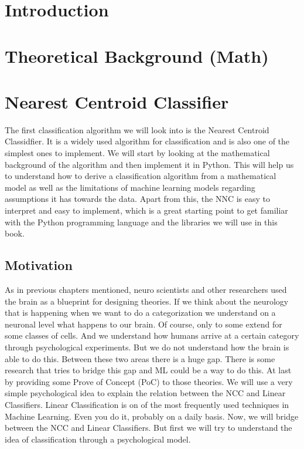 \documentclass[a4paper]{article}
\begin{document}
\pagestyle{fancy}
\begin{multicols}{2}
\tableofcontents
\end{multicols}
\newpage

\section{Introduction}

\section{Theoretical Background (Math)}

\section{Nearest Centroid Classifier}
The first classification algorithm we will look into is the Nearest Centroid Classidfier.
It is a widely used algorithm for classification and is also one of the simplest ones to implement.
We will start by looking at the mathematical background of the algorithm and then implement it in Python.
This will help us to understand how to derive a classification algorithm from a mathematical model as well as the
limitations of machine learning models regarding assumptions it has towards the data.
Apart from this, the NNC is easy to interpret and easy to implement, which is a great starting point to get familiar with 
the Python programming language and the libraries we will use in this book.

\subsection{Motivation}
As in previous chapters mentioned, neuro scientists and other researchers used the brain as a blueprint for
designing theories. If we think about the neurology that is happening when
we want to do a categorization we understand on a neuronal level what happens to our brain.
Of course, only to some extend for some classes of cells. And we understand how humans
arrive at a certain category through psychological experiments. But we do not understand
how the brain is able to do this.
Between these two areas there is a huge gap. There is some research that tries to bridge this gap and ML could be a way to do this.
At last by providing some Prove of Concept (PoC) to those theories.
We will use a very simple psychological idea to explain the relation between the NCC and Linear Classifiers.
Linear Classification is on of the most frequently used techniques in Machine Learning. Even you do it, probably on a daily basis.
Now, we will bridge between the NCC and Linear Classifiers. But first we will try to understand the idea of classification through a psychological model.
\end{document}
